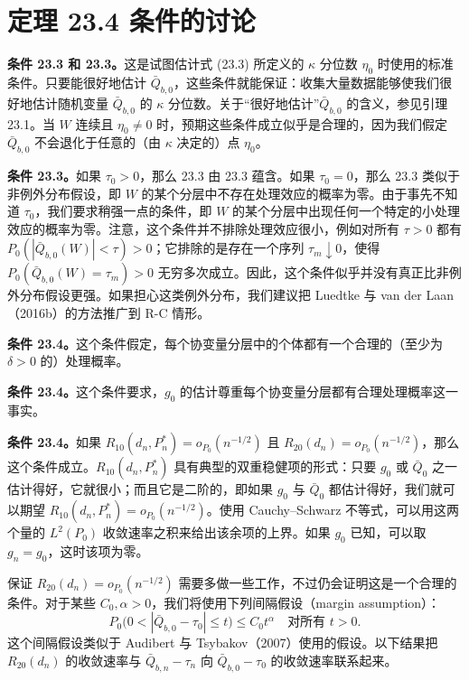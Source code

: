 \section{定理 23.4 条件的讨论}

\noindent\textbf{条件 23.3 和 23.3。}这是试图估计式 (23.3) 所定义的 $\kappa$ 分位数 $\eta_0$ 时使用的标准条件。只要能很好地估计 $\bar Q_{b,0}$，这些条件就能保证：收集大量数据能够使我们很好地估计随机变量 $\bar Q_{b,0}$ 的 $\kappa$ 分位数。关于“很好地估计”$\bar Q_{b,0}$ 的含义，参见引理 23.1。当 $W$ 连续且 $\eta_0\ne0$ 时，预期这些条件成立似乎是合理的，因为我们假定 $\bar Q_{b,0}$ 不会退化于任意的（由 $\kappa$ 决定的）点 $\eta_0$。

\noindent\textbf{条件 23.3。}如果 $\tau_0>0$，那么 23.3 由 23.3 蕴含。如果 $\tau_0=0$，那么 23.3 类似于非例外分布假设，即 $W$ 的某个分层中不存在处理效应的概率为零。由于事先不知道 $\tau_0$，我们要求稍强一点的条件，即 $W$ 的某个分层中出现任何一个特定的小处理效应的概率为零。注意，这个条件并不排除处理效应很小，例如对所有 $\tau>0$ 都有 $P_0(|\bar Q_{b,0}(W)|<\tau)>0$；它排除的是存在一个序列 $\tau_m\downarrow0$，使得 $P_0(\bar Q_{b,0}(W)=\tau_m)>0$ 无穷多次成立。因此，这个条件似乎并没有真正比非例外分布假设更强。如果担心这类例外分布，我们建议把 Luedtke 与 van der Laan（2016b）的方法推广到 R-C 情形。

\noindent\textbf{条件 23.4。}这个条件假定，每个协变量分层中的个体都有一个合理的（至少为 $\delta>0$ 的）处理概率。

\noindent\textbf{条件 23.4。}这个条件要求，$g_0$ 的估计尊重每个协变量分层都有合理处理概率这一事实。

\noindent\textbf{条件 23.4。}如果 $R_{10}(d_n,P_n^*)=o_{P_0}(n^{-1/2})$ 且 $R_{20}(d_n)=o_{P_0}(n^{-1/2})$，那么这个条件成立。$R_{10}(d_n,P_n^*)$ 具有典型的双重稳健项的形式：只要 $g_0$ 或 $\bar Q_0$ 之一估计得好，它就很小；而且它是二阶的，即如果 $g_0$ 与 $\bar Q_0$ 都估计得好，我们就可以期望 $R_{10}(d_n,P_n^*)=o_{P_0}(n^{-1/2})$。使用 Cauchy--Schwarz 不等式，可以用这两个量的 $L^2(P_0)$ 收敛速率之积来给出该余项的上界。如果 $g_0$ 已知，可以取 $g_n=g_0$，这时该项为零。

保证 $R_{20}(d_n)=o_{P_0}(n^{-1/2})$ 需要多做一些工作，不过仍会证明这是一个合理的条件。对于某些 $C_0,\alpha>0$，我们将使用下列间隔假设（margin assumption）：
\begin{equation}
 P_0\bigl(0<|\bar Q_{b,0}-\tau_0|\leq t\bigr)\leq C_0t^\alpha
 \quad\text{对所有 }t>0.
\tag{23.5}
\end{equation}
这个间隔假设类似于 Audibert 与 Tsybakov（2007）使用的假设。以下结果把 $R_{20}(d_n)$ 的收敛速率与 $\bar Q_{b,n}-\tau_n$ 向 $\bar Q_{b,0}-\tau_0$ 的收敛速率联系起来。

